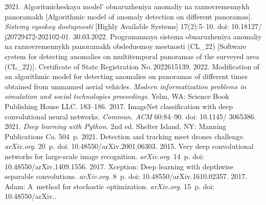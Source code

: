 \begin{multicols}{2}
{{\begin{thebibliography}{99}
 2021. Al\-go\-rit\-mi\-che\-skaya mo\-del'  
ob\-na\-ru\-zhe\-niya ano\-ma\-liy na raz\-no\-vre\-men\-nykh pa\-no\-ra\-makh [Algorithmic model 
of anomaly detection on different panoramas]. \textit{Sis\-te\-my vy\-so\-koy do\-stup\-nosti} [Highly 
Available Systems] 17(2):5--10. doi: 10.18127/ j20729472-202102-01.
 30.03.2022. Pro\-gram\-mnaya sis\-te\-ma 
ob\-na\-ru\-zhe\-niya ano\-ma\-liy na raz\-no\-vre\-men\-nykh pa\-no\-ra\-makh ob\-sle\-du\-emoy 
mest\-nosti (CL\_22) [Software system for detecting anomalies on multitemporal panoramas of the 
surveyed area (CL\_22)]. Certificate of State Registration No.\,2022615139. 
 2022. Modification of an 
algorithmic model for detecting anomalies on panoramas of different times obtained from 
unmanned aerial vehicles. \textit{Modern informatization problems in simulation and social 
technologies proceedings}. Yelm, WA: Science Book Publishing House LLC. 183--186.
 2017. \mbox{ImageNet} classification with deep 
convolutional neural networks. \textit{Commun. ACM} 60:84--90.  doi: 10.1145/ 3065386.
 2021. \textit{Deep learning with Python.} 2nd ed. Shelter Island, NY: Manning 
Publications Co. 504~p.
 2021. Detection and 
tracking meet drones challenge. \textit{arXiv.org}. 20~p. %
doi: 10.48550/arXiv.2001.06303.
 2015. Very deep convolutional networks for large-scale 
image recognition. \textit{\mbox{arXiv}.org}. 14~p. %
doi: 10.48550/arXiv.1409.1556.
 2017. Xception: Deep learning with depthwise separable convolutions. 
\textit{\mbox{arXiv}.org.} 8~p. %
doi: 10.48550/\linebreak arXiv.1610.02357.
 2017. Adam: A~method for stochastic optimization. 
\textit{\mbox{arXiv}.org}. 15~p. %
doi: 
10.48550/arXiv..
\end{thebibliography}

 }
 }

\end{multicols}

